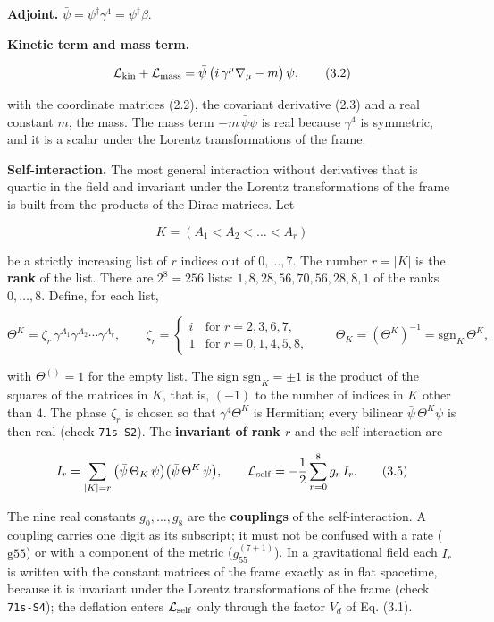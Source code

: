 \documentclass[
  10pt,
]{article}
\begin{document}
\textbf{Adjoint.} \(\bar\psi=\psi^\dagger\gamma^4=\psi^\dagger\beta\).

\textbf{Kinetic term and mass term.}

\[\mathcal L_{\rm kin}+\mathcal L_{\rm mass}=\bar\psi\,\big(i\,\gamma^\mu\nabla_\mu-m\big)\,\psi,\tag{3.2}\]

with the coordinate matrices (2.2), the covariant derivative (2.3) and a
real constant \(m\), the mass. The mass term \(-m\,\bar\psi\psi\) is
real because \(\gamma^4\) is symmetric, and it is a scalar under the
Lorentz transformations of the frame.

\textbf{Self-interaction.} The most general interaction without
derivatives that is quartic in the field and invariant under the Lorentz
transformations of the frame is built from the products of the Dirac
matrices. Let

\[K=(A_1<A_2<\dots<A_r)\tag{3.3}\]

be a strictly increasing list of \(r\) indices out of \(0,\dots,7\). The
number \(r=|K|\) is the \textbf{rank} of the list. There are \(2^8=256\)
lists: \(1,8,28,56,70,56,28,8,1\) of the ranks \(0,\dots,8\). Define,
for each list,

\[\Theta^K=\zeta_r\,\gamma^{A_1}\gamma^{A_2}\cdots\gamma^{A_r},\qquad
\zeta_r=\begin{cases}i&\text{for }r=2,3,6,7,\\1&\text{for }r=0,1,4,5,8,\end{cases}
\qquad\Theta_K=(\Theta^K)^{-1}=\mathrm{sgn}_K\,\Theta^K,\tag{3.4}\]

with \(\Theta^{()}=1\) for the empty list. The sign
\(\mathrm{sgn}_K=\pm1\) is the product of the squares of the matrices in
\(K\), that is, \((-1)\) to the number of indices in \(K\) other than 4.
The phase \(\zeta_r\) is chosen so that \(\gamma^4\Theta^K\) is
Hermitian; every bilinear \(\bar\psi\,\Theta^K\psi\) is then real (check
\texttt{71s-S2}). The \textbf{invariant of rank \(r\)} and the
self-interaction are

\[I_r=\sum_{|K|=r}\big(\bar\psi\,\Theta_K\,\psi\big)\big(\bar\psi\,\Theta^K\,\psi\big),\qquad
\mathcal L_{\rm self}=-\frac12\sum_{r=0}^{8}g_r\,I_r.\tag{3.5}\]

The nine real constants \(g_0,\dots,g_8\) are the \textbf{couplings} of
the self-interaction. A coupling carries one digit as its subscript; it
must not be confused with a rate (\(\mathrm{g55}\)) or with a component
of the metric (\(g^{(7+1)}_{55}\)). In a gravitational field each
\(I_r\) is written with the constant matrices of the frame exactly as in
flat spacetime, because it is invariant under the Lorentz
transformations of the frame (check \texttt{71s-S4}); the deflation
enters \(\mathcal L_{\rm self}\) only through the factor \(V_d\) of Eq.
(3.1).
\end{document}
